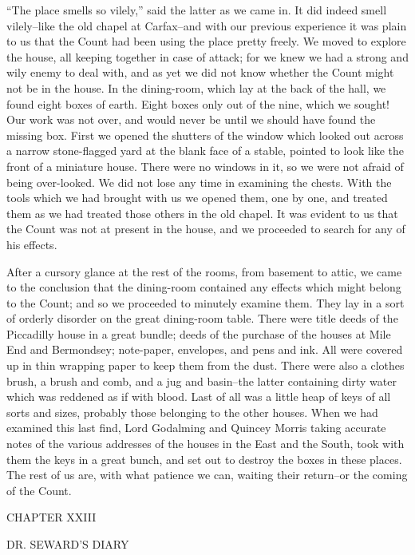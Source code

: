 \documentclass[12pt,openright]{book}
\begin{document}
“The place smells so vilely,” said the latter as we came in. It did indeed smell vilely–like the old chapel at Carfax–and with our previous experience it was plain to us that the Count had been using the place pretty freely. We moved to explore the house, all keeping together in case of attack; for we knew we had a strong and wily enemy to deal with, and as yet we did not know whether the Count might not be in the house. In the dining-room, which lay at the back of the hall, we found eight boxes of earth. Eight boxes only out of the nine, which we sought! Our work was not over, and would never be until we should have found the missing box. First we opened the shutters of the window which looked out across a narrow stone-flagged yard at the blank face of a stable, pointed to look like the front of a miniature house. There were no windows in it, so we were not afraid of being over-looked. We did not lose any time in examining the chests. With the tools which we had brought with us we opened them, one by one, and treated them as we had treated those others in the old chapel. It was evident to us that the Count was not at present in the house, and we proceeded to search for any of his effects.

After a cursory glance at the rest of the rooms, from basement to attic, we came to the conclusion that the dining-room contained any effects which might belong to the Count; and so we proceeded to minutely examine them. They lay in a sort of orderly disorder on the great dining-room table. There were title deeds of the Piccadilly house in a great bundle; deeds of the purchase of the houses at Mile End and Bermondsey; note-paper, envelopes, and pens and ink. All were covered up in thin wrapping paper to keep them from the dust. There were also a clothes brush, a brush and comb, and a jug and basin–the latter containing dirty water which was reddened as if with blood. Last of all was a little heap of keys of all sorts and sizes, probably those belonging to the other houses. When we had examined this last find, Lord Godalming and Quincey Morris taking accurate notes of the various addresses of the houses in the East and the South, took with them the keys in a great bunch, and set out to destroy the boxes in these places. The rest of us are, with what patience we can, waiting their return–or the coming of the Count.

CHAPTER XXIII

DR. SEWARD’S DIARY
\end{document}
